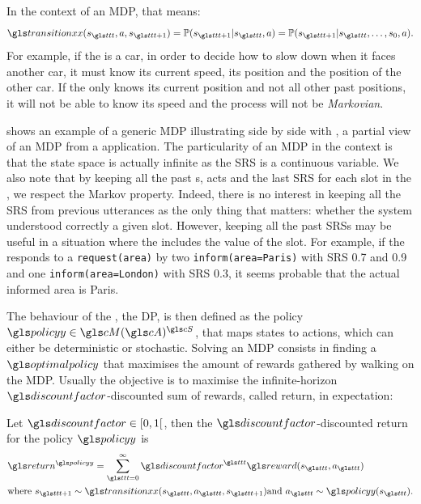 In the context of an \gls{MDP}, that means:
\begin{equation}
    \transition(s_{\indextransition},a,s_{\indextransition+1}) = \mathbb{P}(s_{\indextransition+1}|s_{\indextransition},a) = \mathbb{P}(s_{\indextransition+1}|s_{\indextransition},\dots,s_{0},a).
\end{equation}
For example, if the  is a car, in order to decide how to slow down when it faces another car, it must know its current speed, its position and the position of the other car. If the  only knows its current position and not all other past positions, it will not be able to know its speed and the process will not be \textit{Markovian}.

 shows an example of a generic \gls{MDP} illustrating  side by side with , a partial view of an \gls{MDP} from a    application. The particularity of an \gls{MDP} in the  context is that the state space is actually infinite as the \acrfull{SRS} is a continuous variable. We also note that by keeping all the past s,  acts and the last \gls{SRS} for each slot in the , we respect the Markov property. Indeed, there is no interest in keeping all the \gls{SRS} from previous utterances as the only thing that matters: whether the system understood correctly a given slot. However, keeping all the past \glspl{SRS} may be useful in a situation where the  includes the value of the slot. For example, if the  responds to a \texttt{request(area)} by two \texttt{inform(area=Paris)} with \gls{SRS} 0.7 and 0.9 and one \texttt{inform(area=London)} with \gls{SRS} 0.3, it seems probable that the actual informed area is Paris.

The behaviour of the  , the \gls{DP}, is then defined as the policy $\policy\in\cM(\cA)^{\cS}$, that maps states to actions, which can either be deterministic or stochastic. Solving an \gls{MDP} consists in finding a  $\optimalpolicy$ that maximises the amount of rewards gathered by walking on the \gls{MDP}. Usually the objective is to maximise the infinite-horizon $\discountfactor$-discounted sum of rewards, called return, in expectation:

\begin{definition}
    Let $\discountfactor \in [0,1[$, then the $\discountfactor$-discounted return for the policy $\policy$ is
    \begin{align}
        &\return^{\policy} = \sum_{\indextransition=0}^\infty \discountfactor^{\indextransition} \reward(s_{\indextransition},a_{\indextransition})\\
        & \text{where } s_{\indextransition+1} \sim \transition(s_{\indextransition},a_{\indextransition},s_{\indextransition+1}) \text{and } a_{\indextransition} \sim \policy(s_{\indextransition}).\nonumber
    \end{align}
\end{definition}

